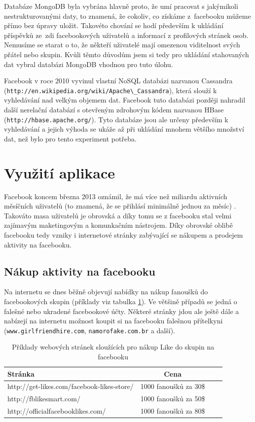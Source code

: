 \documentclass[thesis=M,czech]{FITthesis}[2013/05/10]
\begin{document}
Databáze MongoDB byla vybrána hlavně proto, že umí pracovat s jakýmikoli nestrukturovanými daty, to znamená, že cokoliv, co získáme z~facebooku můžeme přímo bez úpravy uložit. Takovéto chování se hodí především k ukládání příspěvků ze~zdi facebookových uživatelů a informací z profilových stránek osob. Nemusíme se starat o to, že někteří uživatelé mají omezenou viditelnost svých přátel nebo skupin. Kvůli těmto důvodům jsem si tedy pro ukládání stahovaných dat vybral databázi MongoDB vhodnou pro tuto úlohu.

Facebook v roce 2010 vyvinul vlastní NoSQL databázi nazvanou Cassandra (\verb|http://en.wikipedia.org/wiki/Apache\_Cassandra|), která slouží k vyhledávání nad velkým objemem dat. Facebook tuto databázi později nahradil další nerelační databází  s otevřeným zdrohovým kódem nazvanou HBase (\verb|http://hbase.apache.org/|). Tyto databáze jsou ale určeny především k vyhledávání a jejich výhoda se ukáže až při ukládání mnohem většího množství dat, než bylo pro tento experiment potřeba.


\section{Využití aplikace}

Facebook koncem března 2013 oznámil, že má více než miliardu  aktivních měsíčních uživatelů (to znamená, že se přihlásí minimálně jednou za měsíc) \cite{web:fbMonthlyActiveUsers}. Takováto masa uživatelů je obrovská a díky tomu se z facebooku stal velmi zajímavým maketingovým a komunkačním nástrojem. Díky obrovské oblibě facebooku tedy vzniky i internetové stránky zabývající se nákupem a prodejem aktivity na facebooku.

\subsection{Nákup aktivity na facebooku}

Na internetu se dnes běžně objevují nabídky na nákup fanoušků do facebookových skupin (příklady viz tabulka \ref{tab:likesBuy}). Ve většině případů se jedná o falešné nebo ukradené facebookové účty. Některé stránky jdou ale ještě dále a nabízejí na internetu možnost koupit si na facebooku falešnou přítelkyni (\verb|www.girlfriendhire.com|, \verb|namorofake.com.br| a další). 

\begin{table}[h]
\centering
\caption{Příklady webových stránek sloužících pro nákup Like do skupin na facebooku}\label{tab:likesBuy}
\begin{tabular}{| l | c | p{5cm} | c |}
	\hline
	\textbf{Stránka} & 
	\textbf{Cena} \\ \hline
	
	http://get-likes.com/facebook-likes-store/ &
	1000 fanoušků za 30\$ \\ \hline
	
	http://fblikesmart.com/ &
	1000 fanoušků za 50\$ \\ \hline
	
	http://officialfacebooklikes.com/ &
	1000 fanoušků za 80\$ \\ \hline
\end{tabular}
\end{table}
\end{document}
